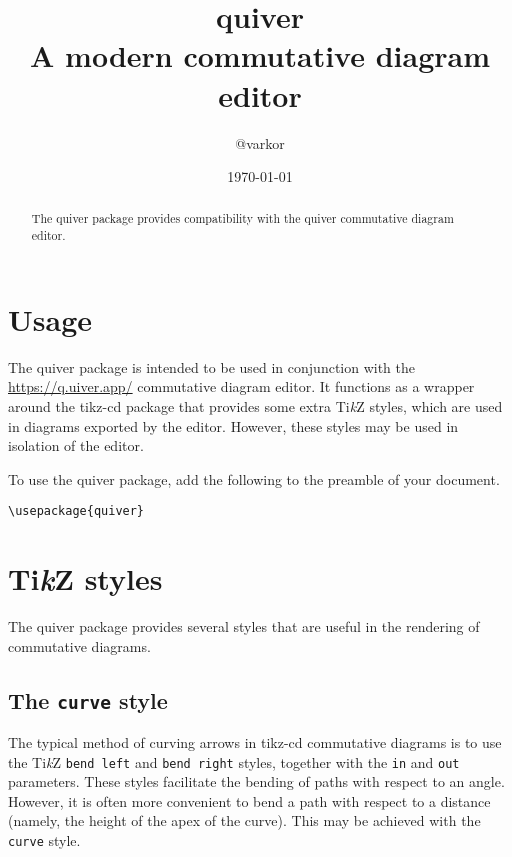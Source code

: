 \documentclass[12pt,a4paper]{article}
\title{\textsf{quiver} \\ \small A modern commutative diagram editor}
\author{\normalsize \textsf{@varkor}}
\date{\cleanlookdateon\today}
\newcommand{\quiver}{\textsf{quiver}}
\newcommand{\tcd}{\textsf{tikz-cd}}
\newcommand{\TikZ}{{\rm Ti{\it k}Z}}
\begin{document}
\maketitle

\begin{abstract}
    The \textsf{quiver} package provides compatibility with the \textsf{quiver} commutative diagram editor.
\end{abstract}

\section{Usage}

The \quiver{} package is intended to be used in conjunction with the \url{https://q.uiver.app/} commutative diagram editor. It functions as a wrapper around the \tcd{} package that provides some extra \TikZ{} styles, which are used in diagrams exported by the editor. However, these styles may be used in isolation of the editor.

To use the \quiver{} package, add the following to the preamble of your document.

\begin{verbatim}
\usepackage{quiver}
\end{verbatim}

\section{\TikZ{} styles}

The \quiver{} package provides several styles that are useful in the rendering of commutative diagrams.

\subsection{The \texttt{curve} style}

The typical method of curving arrows in \tcd{} commutative diagrams is to use the \TikZ{} \texttt{bend left} and \texttt{bend right} styles, together with the \texttt{in} and \texttt{out} parameters. These styles facilitate the bending of paths with respect to an angle. However, it is often more convenient to bend a path with respect to a distance (namely, the height of the apex of the curve). This may be achieved with the \texttt{curve} style\footnotemark{}.

\begin{tikzexample}
\end{tikzexample}
\end{document}
